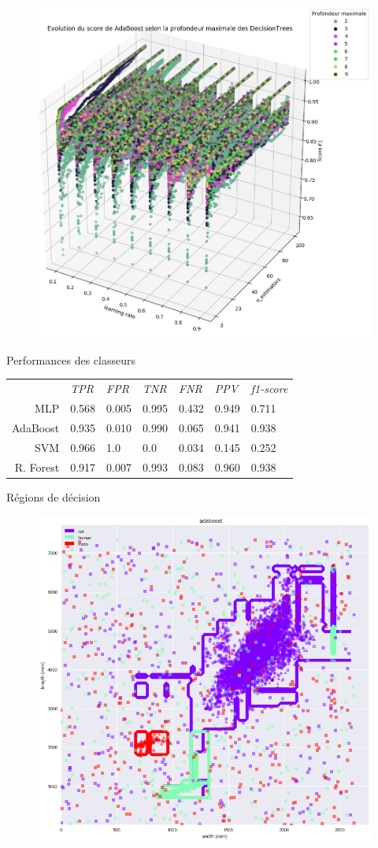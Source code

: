 \documentclass{beamer}
\begin{document}
\begin{frame}
\begin{figure}
\centering
\includegraphics[width=.7\textwidth]{img/adaboost_depth.png}
\end{figure}
\end{frame}

\begin{frame}{Performances des classeurs}
\begin{table}
\centering
\begin{tabular}{r | llllll}
& \emph{TPR} & \emph{FPR} & \emph{TNR} & \emph{FNR} & \emph{PPV} & \emph{f1-score} \\ 
MLP & 0.568 & 0.005 & 0.995 & 0.432 & 0.949 & 0.711 \\
AdaBoost & 0.935 & 0.010 & 0.990 & 0.065 & 0.941 & 0.938 \\
SVM & 0.966 & 1.0 & 0.0 & 0.034 & 0.145 & 0.252 \\
R. Forest & 0.917 & 0.007 & 0.993 & 0.083 & 0.960 & 0.938 \\
\end{tabular}
\end{table}
\end{frame}

\begin{frame}{Régions de décision}
\begin{figure}
\centering
\includegraphics[width=.65\textwidth]{img/adaboost_contour.png}
\end{figure}
\end{frame}
\end{document}
